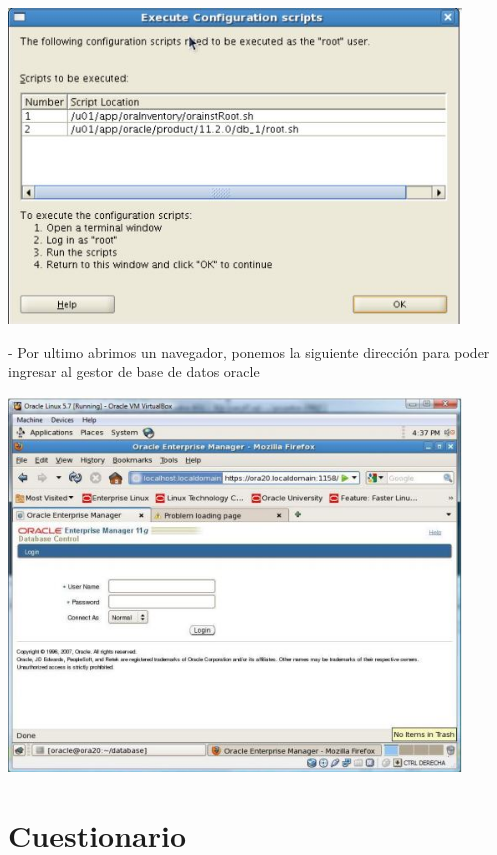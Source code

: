 \documentclass[12pt,letterpaper]{article}
\begin{document}
\begin{center}
	\includegraphics[width=12cm]{./Imagenes/34} 
\end{center}


\begin{itemize}
- Por ultimo abrimos un navegador, ponemos la siguiente dirección para poder ingresar al gestor de base de datos oracle \\
\end{itemize}

\begin{center}
	\includegraphics[width=12cm]{./Imagenes/35} 
\end{center}

\section{Cuestionario} 
\end{document}
